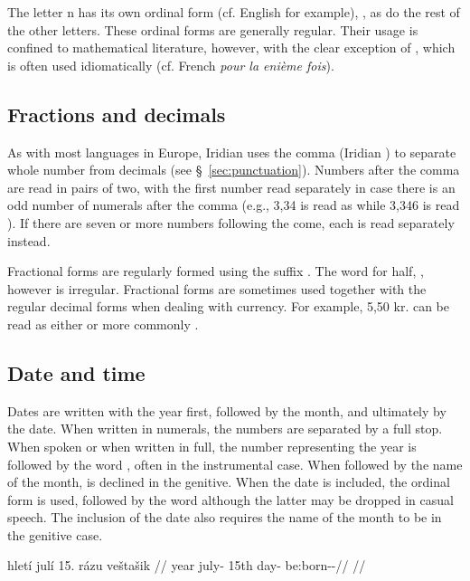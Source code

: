 The letter n has its own ordinal form (cf. English  for example),
, as do the rest of the other letters. These ordinal forms are
generally regular. Their usage is confined to mathematical literature, however,
with the clear exception of , which is often used idiomatically (cf.
French \textit{pour la eni\`eme fois}).


\subsection{Fractions and decimals}

As with most languages in Europe, Iridian uses the comma (Iridian ) to separate whole number from decimals (see \S~\ref{sec:punctuation}). Numbers after the comma are read in pairs of two, with the first number read separately in case there is an odd number of numerals after the comma (e.g., 3,34 is read as  while 3,346 is read ). If there are seven or more numbers following the come, each is read separately instead.

Fractional forms are regularly formed using the suffix . The word for half, , however is irregular. Fractional forms are sometimes used together with the regular decimal forms when dealing with currency. For example, 5,50 kr. can be read as either  or more commonly .

\subsection{Date and time}
Dates are written with the year first, followed by the month, and ultimately by the date. When written in numerals, the numbers are separated by a full stop. When spoken or when written in full, the number representing the year is followed by the word , often in the instrumental case. When followed by the name of the month,  is declined in the genitive. When the date is included, the ordinal form is used, followed by the word  although the latter may be dropped in casual speech. The inclusion of the date also requires the name of the month to be in the genitive case.

\pex
\a
\begingl
     hletí julí 15. rázu veštašik //
     year july-\Gen{} 15th day-\Ins{} be:born-\Av{}-\Pf{}//
    \glft {}//
\endgl
\xe

